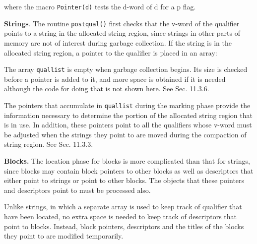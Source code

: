 \goodbreak
{}


\noindent
where the macro \texttt{Pointer(d)} tests the d-word of d for a p flag.

\textbf{Strings}. The routine \texttt{postqual()} first checks that
the v-word of the qualifier points to a string in the allocated string
region, since strings in other parts of memory are not of interest
during garbage collection. If the string is in the allocated string
region, a pointer to the qualifier is placed in an array:

\goodbreak
{}



The array \texttt{quallist} is empty when garbage collection
begins. Its size is checked before a pointer is added to it, and more
space is obtained if it is needed although the code for doing that is
not shown here. See Sec. 11.3.6.

The pointers that accumulate in \texttt{quallist} during the marking
phase provide the information necessary to determine the portion of
the allocated string region that is in use. In addition, these
pointers point to all the qualifiers whose v-word must be adjusted
when the strings they point to are moved during the compaction of
string region. See Sec. 11.3.3.

\textbf{Blocks. }The location phase for blocks is more complicated
than that for strings, since blocks may contain block pointers to
other blocks as well as descriptors that either point to strings or
point to other blocks.  The objects that these pointers and
descriptors point to must be processed also.

Unlike strings, in which a separate array is used to keep track of
qualifier that have been located, no extra space is needed to keep
track of descriptors that point to blocks. Instead, block pointers,
descriptors and the titles of the blocks they point to are modified
temporarily.

